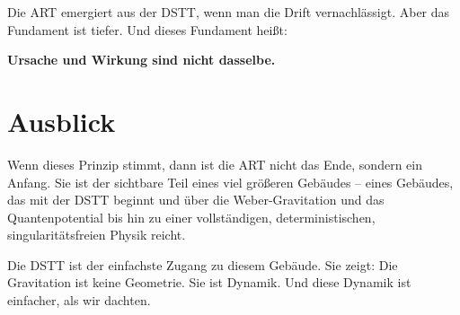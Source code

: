 \documentclass[12pt,a4paper]{article}
\begin{document}
Die ART emergiert aus der DSTT, wenn man die Drift vernachlässigt. Aber das Fundament ist tiefer. Und dieses Fundament heißt:

\begin{center}
\Large
\textbf{Ursache und Wirkung sind nicht dasselbe.}
\end{center}

\section*{Ausblick}

Wenn dieses Prinzip stimmt, dann ist die ART nicht das Ende, sondern ein Anfang. Sie ist der sichtbare Teil eines viel größeren Gebäudes – eines Gebäudes, das mit der DSTT beginnt und über die Weber-Gravitation und das Quantenpotential bis hin zu einer vollständigen, deterministischen, singularitätsfreien Physik reicht.

Die DSTT ist der einfachste Zugang zu diesem Gebäude. Sie zeigt: Die Gravitation ist keine Geometrie. Sie ist Dynamik. Und diese Dynamik ist einfacher, als wir dachten.
\end{document}
